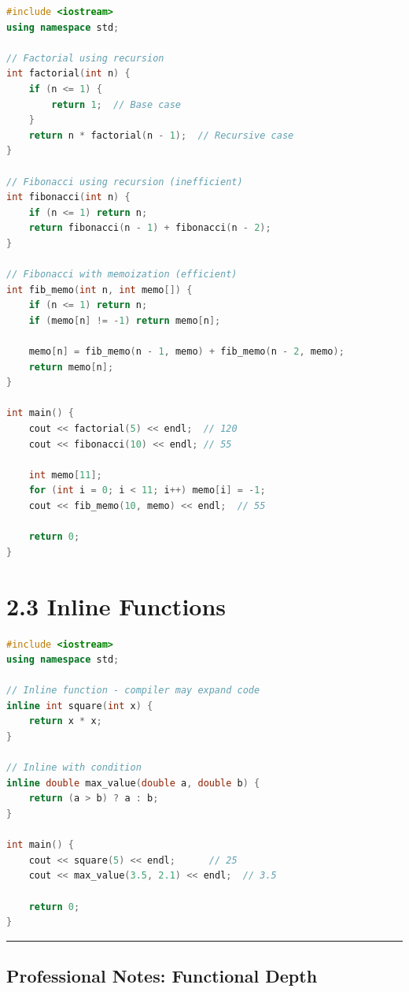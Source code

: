 \begin{lstlisting}[language={C++}]
#include <iostream>
using namespace std;

// Factorial using recursion
int factorial(int n) {
    if (n <= 1) {
        return 1;  // Base case
    }
    return n * factorial(n - 1);  // Recursive case
}

// Fibonacci using recursion (inefficient)
int fibonacci(int n) {
    if (n <= 1) return n;
    return fibonacci(n - 1) + fibonacci(n - 2);
}

// Fibonacci with memoization (efficient)
int fib_memo(int n, int memo[]) {
    if (n <= 1) return n;
    if (memo[n] != -1) return memo[n];
    
    memo[n] = fib_memo(n - 1, memo) + fib_memo(n - 2, memo);
    return memo[n];
}

int main() {
    cout << factorial(5) << endl;  // 120
    cout << fibonacci(10) << endl; // 55
    
    int memo[11];
    for (int i = 0; i < 11; i++) memo[i] = -1;
    cout << fib_memo(10, memo) << endl;  // 55
    
    return 0;
}
\end{lstlisting}

\hypertarget{inline-functions}{%
\section{2.3 Inline Functions}\label{inline-functions}}

\begin{lstlisting}[language={C++}]
#include <iostream>
using namespace std;

// Inline function - compiler may expand code
inline int square(int x) {
    return x * x;
}

// Inline with condition
inline double max_value(double a, double b) {
    return (a > b) ? a : b;
}

int main() {
    cout << square(5) << endl;      // 25
    cout << max_value(3.5, 2.1) << endl;  // 3.5
    
    return 0;
}
\end{lstlisting}

\begin{center}\rule{0.5\linewidth}{0.5pt}\end{center}

\hypertarget{professional-notes-functional-depth}{%
\subsection{Professional Notes: Functional
Depth}\label{professional-notes-functional-depth}}

